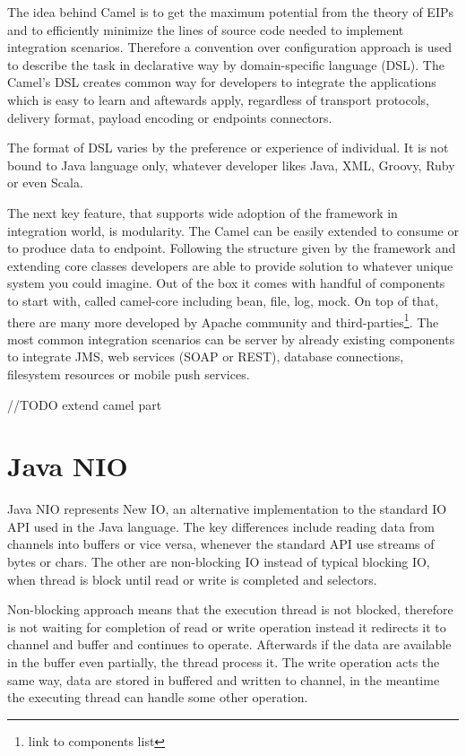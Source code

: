 \documentclass[11pt,draft,oneside]{fithesis2}
\begin{document}
The idea behind Camel is to get the maximum potential from the theory of EIPs and to efficiently minimize the lines of source code needed to implement integration scenarios. Therefore a convention over configuration approach is used to describe the task in declarative way by domain-specific language (DSL).  The Camel's DSL creates common way for developers to integrate the applications which is easy to learn and aftewards apply, regardless of transport protocols, delivery format, payload encoding or endpoints connectors.

The format of DSL varies by the preference or experience of individual. It is not bound to Java language only, whatever developer likes Java, XML, Groovy, Ruby or even Scala.

The next key feature, that supports wide adoption of the framework in integration world, is modularity. The Camel can be easily extended to  consume or to produce data to endpoint. Following the structure given by the framework and extending core classes developers are able to provide solution to whatever unique system you could imagine. Out of the box it comes with handful of components to start with, called camel-core including bean, file, log, mock. On top of that, there are many more developed by Apache community and third-parties\footnote{link to components list}. The most common integration scenarios can be server by already existing components to integrate JMS, web services (SOAP or REST), database connections, filesystem resources or mobile push services.

//TODO extend camel part

\section{Java NIO}
Java NIO represents New IO, an alternative implementation to the standard IO API used in the Java language. The key differences include reading data from channels into buffers or vice versa, whenever the standard API use streams of bytes or chars. The other are non-blocking IO instead of typical blocking IO, when thread is block until read or write is completed and selectors.  

Non-blocking approach means that the execution thread is not blocked, therefore is not waiting for completion of read or write operation instead it redirects it to channel and buffer and continues to operate. Afterwards if the data are available in the buffer even partially, the thread process it. The write operation acts the same way, data are stored in buffered and written to channel, in the meantime the executing thread can handle some other operation.
\end{document}
